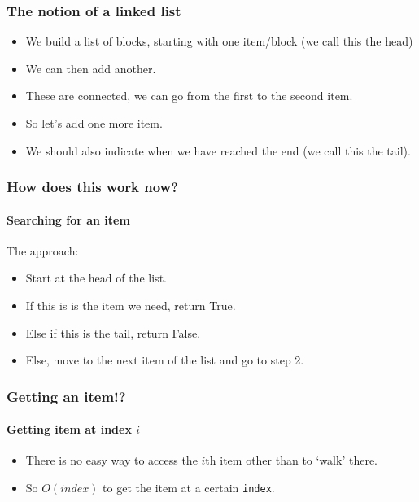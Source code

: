 \begin{frame}
	\frametitle{The notion of a linked list}
			\begin{itemize}
				\item We build a list of blocks, starting with one item/block (we call this the \alert{head})
				\item We can then add another.
				\item These are connected, we can go from the first to the second item.
				\item So let's add one more item.
				\item We should also indicate when we have reached the end (we call this the \alert{tail}).
			\end{itemize}
\end{frame}

\begin{frame}
	\frametitle{How does this work now?}
	\framesubtitle{Searching for an item}	
	The approach:
	\begin{itemize}
		\item Start at the head of the list.
		\item If this is is the item we need, return True.
		\item Else if this is the tail, return False.
		\item Else, move to the next item of the list and go to step 2.
	\end{itemize}

	

	

\end{frame}

\begin{frame}
	\frametitle{Getting an item!?}
	\framesubtitle{Getting item at index $i$}

	\begin{itemize}
		\item There is no easy way to access the $i$th item other than to `walk' there.
		\item So $O(\textit{index})$ to get the item at a certain \texttt{index}.
	\end{itemize}
	
\end{frame}

